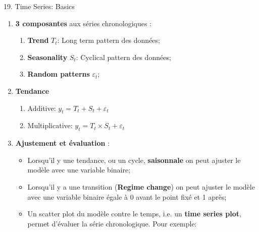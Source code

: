 \documentclass[12pt, titlepage, french]{report}
\begin{document}
\begin{CHPT_SUMM}[label = {timeseries19}]{19. Time Series: Basics}
\begin{enumerate}
\begin{itemize}
		\end{itemize}
	\item[]	\textbf{3 composantes} aux séries chronologiques :
		\begin{enumerate}
		\item	\textbf{Trend} $T_{t}$: Long term pattern des données;
		\item	\textbf{Seasonality} $S_{t}$: Cyclical pattern des données;
		\item	\textbf{Random patterns} $\varepsilon_{t}$;
		\end{enumerate}	
	\item[]	\textbf{Tendance} 
		\begin{enumerate}
			\item	Additive: 		$y_{t} = T_{t} + S_{t} + \varepsilon_{t}$
			\item	Multiplicative: 	$y_{t} = T_{t} \times S_{t} + \varepsilon_{t}$
		\end{enumerate}
	\item[]	\textbf{Ajustement et évaluation} :
		\begin{itemize}
		\item	Lorsqu'il y une tendance, ou un cycle, \textbf{saisonnale} on peut ajuster le modèle avec une variable binaire;
		\item	Lorsqu'il y a une transition (\textbf{Regime change}) on peut ajuster le modèle avec une variable binaire égale à 0 avant le point fixé et 1 après;
		\item	Un scatter plot du modèle contre le temps, i.e. un \textbf{time series plot}, permet d'évaluer la série chronologique. 
		Pour exemple:
		

\end{itemize}
\end{enumerate}
\end{CHPT_SUMM}
\end{document}
